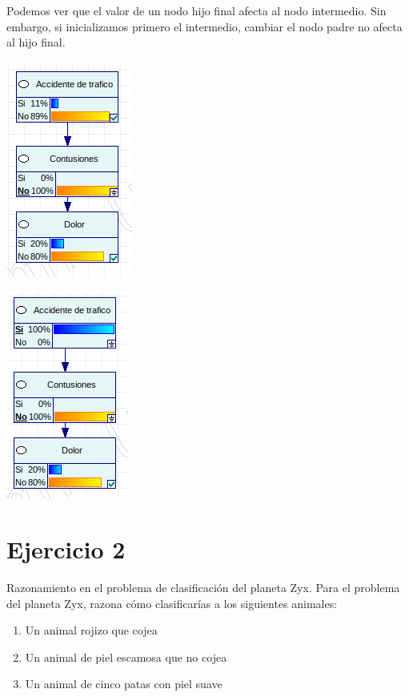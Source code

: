 \documentclass{article}
\begin{document}
Podemos ver que el valor de un nodo hijo final afecta al nodo intermedio. Sin embargo, si inicializamos primero el intermedio, cambiar el nodo padre no afecta al hijo final.

\begin{center}
\includegraphics[scale=0.5]{1c4.png}
\end{center}

\begin{center}
\includegraphics[scale=0.5]{1c5.png}
\end{center}

\section{\textbf{Ejercicio 2}}

Razonamiento en el problema de clasificación del planeta Zyx. Para el problema del
planeta Zyx, razona cómo clasificarías a los siguientes animales:

\begin{enumerate}[label=\alph*)]
\item Un animal rojizo que cojea
\item Un animal de piel escamosa que no cojea
\item Un animal de cinco patas con piel suave
\end{enumerate}
\end{document}
